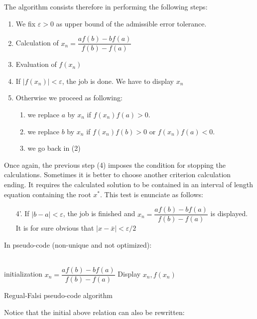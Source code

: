 	The algorithm consists therefore in performing the following steps:
	\begin{enumerate}
		\item We fix $\varepsilon>0$ as upper bound of the admissible error tolerance.
	
		\item Calculation of $x_n=\dfrac{af(b)-bf(a)}{f(b)-f(a)}$

		\item Evaluation of $f(x_n)$

		\item If $|f(x_n)|<\varepsilon$, the job is done. We have to display $x_n$

		\item Otherwise we proceed as following:
			\begin{enumerate}
				\item we replace $a$ by $x_n$ if $f(x_n)f(a)>0$.
	
				\item we replace $b$ by $x_n$ if $f(x_n)f(b)>0$ or $f(x_n)f(a)<0$.
				
				\item we go back in (2)
			\end{enumerate}
 	\end{enumerate}
 	Once again, the previous step (4) imposes the condition for stopping the calculations. Sometimes it is better to choose another criterion calculation ending. It requires the calculated solution to be contained in an interval of length equation containing the root $x^{*}$. This test is enunciate as follows:
	\begin{enumerate}
		\item[4'.] If $|b-a|<\varepsilon$, the job is finished and $x_n=\dfrac{af(b)-bf(a)}{f(b)-f(a)}$ is displayed. It is for sure obvious that $|x-\bar{x}|<\varepsilon/2$
	\end{enumerate}
 	In pseudo-code (non-unique and not optimized):\\\\
	\begin{algorithm}[H]
	 initialization\;
	$x_n=\dfrac{af(b)-bf(a)}{f(b)-f(a)}$\;
	 Display $x_n,f(x_n)$\;
	 \caption{Regual-Falsi pseudo-code algorithm}
	\end{algorithm}
	Notice that the initial above relation can also be rewritten:
	
